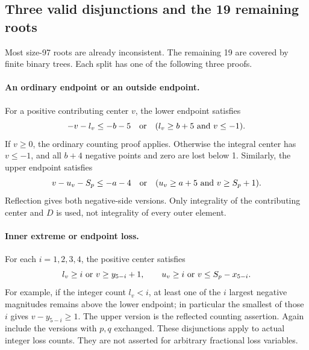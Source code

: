 \documentclass[11pt,a4paper]{article}
\theoremstyle{remark}
\begin{document}
\subsection{Three valid disjunctions and the 19 remaining roots}
Most size-97 roots are already inconsistent. The remaining 19 are covered
by finite binary trees. Each split has one of the following three proofs.

\paragraph{An ordinary endpoint or an outside endpoint.}
For a positive contributing center $v$, the lower endpoint satisfies
\begin{equation}
 -v-l_v\leq-b-5
 \quad\hbox{or}\quad (l_v\geq b+5\ \hbox{and}\ v\leq-1).
 \label{u96:eq:branch-normal-low96}
\end{equation}
If $v\geq0$, the ordinary counting proof applies. Otherwise the integral
center has $v\leq-1$, and all $b+4$ negative points and zero are lost
below 1. Similarly, the upper endpoint satisfies
\begin{equation}
 v-u_v-S_p\leq-a-4
 \quad\hbox{or}\quad (u_v\geq a+5\ \hbox{and}\ v\geq S_p+1).
 \label{u96:eq:branch-normal-high96}
\end{equation}
Reflection gives both negative-side versions. Only integrality of the
contributing center and $D$ is used, not integrality of every outer element.

\paragraph{Inner extreme or endpoint loss.}
For each $i=1,2,3,4$, the positive center satisfies
\begin{equation}
 l_v\geq i\ \hbox{or}\ v\geq y_{5-i}+1,
 \qquad
 u_v\geq i\ \hbox{or}\ v\leq S_p-x_{5-i}.
 \label{u96:eq:branch-inner96}
\end{equation}
For example, if the integer count $l_v<i$, at least one of the $i$
largest negative magnitudes remains above the lower endpoint; in
particular the smallest of those $i$ gives $v-y_{5-i}\geq1$.
The upper version is the reflected counting assertion. Again include the
versions with $p,q$ exchanged. These disjunctions apply to actual integer
loss counts. They are not asserted for arbitrary fractional loss variables.
\end{document}
